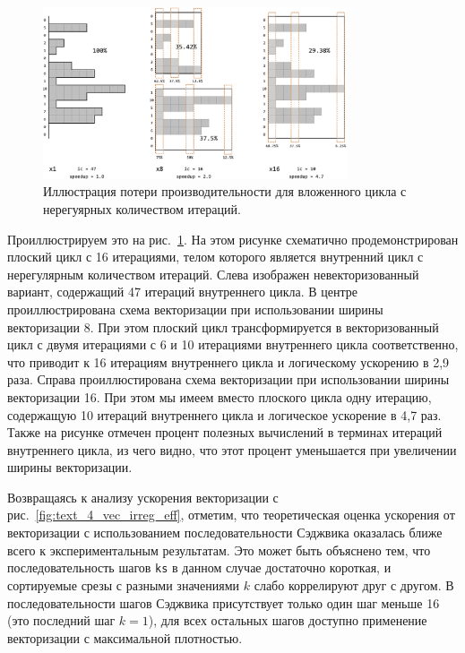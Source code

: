 \begin{figure}[ht]
\centering
\includegraphics[width=0.8\textwidth]{./pics/text_4_vec_irreg/pack.png}
\singlespacing
{}\caption{Иллюстрация потери производительности для вложенного цикла с нерегуярных количеством итераций.}
\label{fig:text_4_vec_irreg_pack}
\end{figure}

Проиллюстрируем это на рис.~\ref{fig:text_4_vec_irreg_pack}.
На этом рисунке схематично продемонстрирован плоский цикл с 16 итерациями, телом которого является внутренний цикл с нерегулярным количеством итераций.
Слева изображен невекторизованный вариант, содержащий 47 итераций внутреннего цикла.
В центре проиллюстрирована схема векторизации при использовании ширины векторизации 8.
При этом плоский цикл трансформируется в векторизованный цикл с двумя итерациями с 6 и 10 итерациями внутреннего цикла соответственно, что приводит к 16 итерациям внутреннего цикла и логическому ускорению в 2,9 раза.
Справа проиллюстирована схема векторизации при использовании ширины векторизации 16.
При этом мы имеем вместо плоского цикла одну итерацию, содержащую 10 итераций внутреннего цикла и логическое ускорение в 4,7 раз.
Также на рисунке отмечен процент полезных вычислений в терминах итераций внутреннего цикла, из чего видно, что этот процент уменьшается при увеличении ширины векторизации.

Возвращаясь к анализу ускорения векторизации с рис.~\ref{fig:text_4_vec_irreg_eff}, отметим, что теоретическая оценка ускорения от векторизации с использованием последовательности Сэджвика оказалась ближе всего к экспериментальным результатам.
Это может быть объяснено тем, что последовательность шагов \texttt{ks} в данном случае достаточно короткая, и сортируемые срезы с разными значениями $k$ слабо коррелируют друг с другом.
В последовательности шагов Сэджвика присутствует только один шаг меньше 16 (это последний шаг $k = 1$), для всех остальных шагов доступно применение векторизации с максимальной плотностью.


